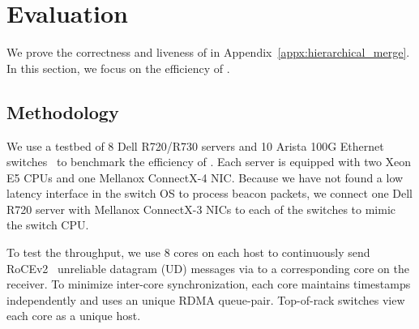 \section{Evaluation}
\label{sec:evaluation}


We prove the correctness and liveness of \sys in Appendix~\ref{appx:hierarchical_merge}.
In this section, we focus on the efficiency of \sys.

\subsection{Methodology}
\label{sec:testbed}

We use a testbed of 8 Dell R720/R730 servers and 10 Arista 100G Ethernet switches~\cite{arista} to benchmark the efficiency of \sys. %
Each server is equipped with two Xeon E5 CPUs and one Mellanox ConnectX-4 NIC. Because we have not found a low latency interface in the switch OS to process beacon packets, we connect one Dell R720 server with Mellanox ConnectX-3 NICs to each of the switches to mimic the switch CPU. %

To test the throughput, we use 8 cores on each host to continuously send RoCEv2~\cite{infinibandrocev2} unreliable datagram (UD) messages via \sys to a corresponding core on the receiver. To minimize inter-core synchronization, each core maintains timestamps independently and uses an unique RDMA queue-pair. Top-of-rack switches view each core as a unique host.


\begin{table}[t]
\centering
{}
\caption{Network topologies for evaluation.}
\label{tab:eval-topology}
\end{table}

